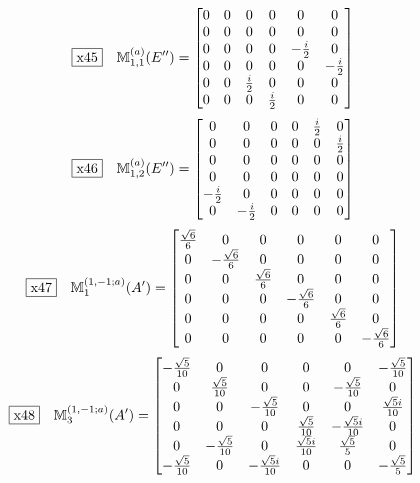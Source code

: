 \documentclass[fleqn,10pt,landscape]{jsarticle}
\begin{document}
\begin{dmath*}
\fbox{x45}\quad \mathbb{M}_{1,1}^{(a)}(E^{\prime\prime})=\begin{bmatrix} 0 & 0 & 0 & 0 & 0 & 0 \\ 0 & 0 & 0 & 0 & 0 & 0 \\ 0 & 0 & 0 & 0 & - \frac{i}{2} & 0 \\ 0 & 0 & 0 & 0 & 0 & - \frac{i}{2} \\ 0 & 0 & \frac{i}{2} & 0 & 0 & 0 \\ 0 & 0 & 0 & \frac{i}{2} & 0 & 0 \end{bmatrix}
\end{dmath*}
\begin{dmath*}
\fbox{x46}\quad \mathbb{M}_{1,2}^{(a)}(E^{\prime\prime})=\begin{bmatrix} 0 & 0 & 0 & 0 & \frac{i}{2} & 0 \\ 0 & 0 & 0 & 0 & 0 & \frac{i}{2} \\ 0 & 0 & 0 & 0 & 0 & 0 \\ 0 & 0 & 0 & 0 & 0 & 0 \\ - \frac{i}{2} & 0 & 0 & 0 & 0 & 0 \\ 0 & - \frac{i}{2} & 0 & 0 & 0 & 0 \end{bmatrix}
\end{dmath*}
\begin{dmath*}
\fbox{x47}\quad \mathbb{M}_{1}^{(1,-1;a)}(A^{\prime})=\begin{bmatrix} \frac{\sqrt{6}}{6} & 0 & 0 & 0 & 0 & 0 \\ 0 & - \frac{\sqrt{6}}{6} & 0 & 0 & 0 & 0 \\ 0 & 0 & \frac{\sqrt{6}}{6} & 0 & 0 & 0 \\ 0 & 0 & 0 & - \frac{\sqrt{6}}{6} & 0 & 0 \\ 0 & 0 & 0 & 0 & \frac{\sqrt{6}}{6} & 0 \\ 0 & 0 & 0 & 0 & 0 & - \frac{\sqrt{6}}{6} \end{bmatrix}
\end{dmath*}
\begin{dmath*}
\fbox{x48}\quad \mathbb{M}_{3}^{(1,-1;a)}(A^{\prime})=\begin{bmatrix} - \frac{\sqrt{5}}{10} & 0 & 0 & 0 & 0 & - \frac{\sqrt{5}}{10} \\ 0 & \frac{\sqrt{5}}{10} & 0 & 0 & - \frac{\sqrt{5}}{10} & 0 \\ 0 & 0 & - \frac{\sqrt{5}}{10} & 0 & 0 & \frac{\sqrt{5} i}{10} \\ 0 & 0 & 0 & \frac{\sqrt{5}}{10} & - \frac{\sqrt{5} i}{10} & 0 \\ 0 & - \frac{\sqrt{5}}{10} & 0 & \frac{\sqrt{5} i}{10} & \frac{\sqrt{5}}{5} & 0 \\ - \frac{\sqrt{5}}{10} & 0 & - \frac{\sqrt{5} i}{10} & 0 & 0 & - \frac{\sqrt{5}}{5} \end{bmatrix}
\end{dmath*}
\end{document}
